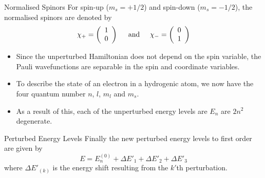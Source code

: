 \documentclass[aspectratio=1610,xcolor=dvipsnames,t]{beamer}
\begin{document}
    \begin{frame}{Normalised Spinors} 
    For spin-up ($m_s = +1/2$) and spin-down ($m_s = -1/2$),
    the normalised spinors are denoted by
    \begin{equation}
        \chi_+ = \left( \begin{array}{c}
                    1 \\ 0
                 \end{array} \right)
        \hspace{5mm} \mathrm{and} \hspace{5mm}
        \chi_- = \left( \begin{array}{c}
                    0 \\ 1
                 \end{array} \right)
    \end{equation}

    \begin{itemize} 
        \item Since the unperturbed Hamiltonian does not depend on the spin variable, the
        Pauli wavefunctions are separable in the spin and coordinate variables.
        \item To describe the state of an electron in a hydrogenic atom, we now have the four
        quantum number $n$, $l$, $m_l$ and $m_s$. 
        \item As a result of this, each of the
        unperturbed energy levels are $E_n$ are $2n^2$ degenerate.
    \end{itemize} 
    \end{frame} 

    \begin{frame}{Perturbed Energy Levels} 
    Finally the new perturbed energy levels to first order are given by
    \begin{equation}
        E = E_{n}^{(0)} + \Delta E'_1 + \Delta E'_2 + \Delta E'_3
    \end{equation}
    where $\Delta E'_{(k)}$ is the energy shift resulting from the $k'$th perturbation.
    \end{frame} 
    
\end{document}
